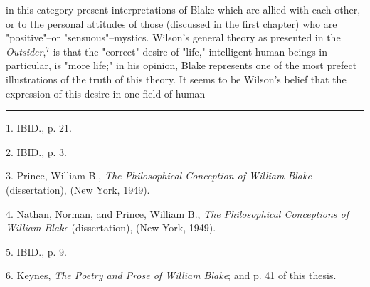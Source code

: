 in this category present interpretations of Blake which are
allied with each other, or to the personal attitudes of
those (discussed in the first chapter) who are "positive"--or
"sensuous"--mystics. Wilson's general theory as presented in the
\textit{Outsider},$^{7}$ is that the "correct" desire of
"life," intelligent human beings in particular, is "more life;"
in his opinion, Blake represents one of the most
prefect illustrations of the truth of this theory. It seems to be Wilson's
belief that the expression of this desire in one field of human\linebreak
\null\par
\vspace*{-\baselineskip}
\vspace*{\fill}
\noindent\rule{0.25\textwidth}{0.4pt}\par
1. IBID., p. 21.\par
2. IBID., p. 3.\par
3. Prince, William B., \textit{The Philosophical Conception of William Blake} (dissertation), (New York, 1949).\par
4. Nathan, Norman, and Prince, William B., \textit{The Philosophical Conceptions of William Blake} (dissertation), (New York, 1949).\par
5. IBID., p. 9.\par
6. Keynes, \textit{The Poetry and Prose of William Blake}; and p. 41 of this thesis.\par

\newpage

